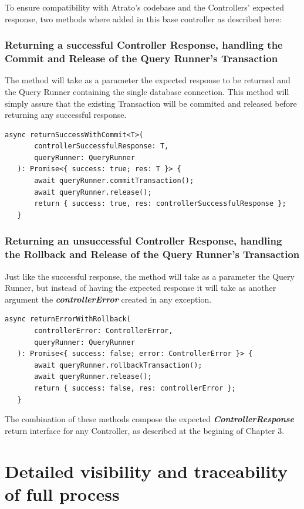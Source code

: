 To ensure compatibility with Atrato's codebase and the Controllers' expected response, two methods where added in this base controller as described here: 

\subsubsection{Returning a successful Controller Response, handling the Commit and Release of the Query Runner's Transaction}

The method will take as a parameter the expected response to be returned and the Query Runner containing the single database connection. This method will simply assure that the existing Transaction will be commited and released before returning any successful response.

\begin{verbatim}
async returnSuccessWithCommit<T>(
       controllerSuccessfulResponse: T,
       queryRunner: QueryRunner
   ): Promise<{ success: true; res: T }> {
       await queryRunner.commitTransaction();
       await queryRunner.release();
       return { success: true, res: controllerSuccessfulResponse };
   }
\end{verbatim}

\subsubsection{Returning an unsuccessful Controller Response, handling the Rollback and Release of the Query Runner's Transaction}


Just like the successful response, the method will take as a parameter the Query Runner, but instead of having the expected response it will take as another argument the \textbf{\textit{controllerError}} created in any exception.

\begin{verbatim}
async returnErrorWithRollback(
       controllerError: ControllerError,
       queryRunner: QueryRunner
   ): Promise<{ success: false; error: ControllerError }> {
       await queryRunner.rollbackTransaction();
       await queryRunner.release();
       return { success: false, res: controllerError };
   }
\end{verbatim}

The combination of these methods compose the expected \textbf{\textit{ControllerResponse}} return interface for any Controller, as described at the begining of Chapter 3.

\section{Detailed visibility and traceability of full process}

